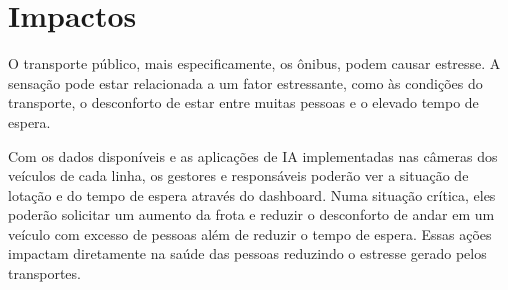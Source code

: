 \section{Impactos}
\indent
\par O transporte público, mais especificamente, os ônibus, podem causar estresse. A sensação pode estar relacionada a um fator estressante, como às condições do transporte, o desconforto de estar entre muitas pessoas e o elevado tempo de espera.
\par Com os dados disponíveis e as aplicações de IA implementadas nas câmeras dos veículos de cada linha, os gestores e responsáveis poderão ver a situação de lotação e do tempo de espera através do dashboard. Numa situação crítica, eles poderão solicitar um aumento da frota e reduzir o desconforto de andar em um veículo com excesso de pessoas além de reduzir o tempo de espera. Essas ações impactam diretamente na saúde das pessoas reduzindo o estresse gerado pelos transportes.